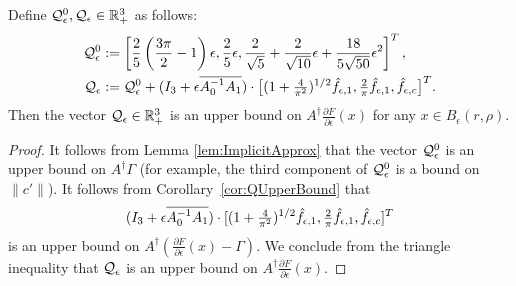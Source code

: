 \begin{lemma}\label{lem:Qeps}
%
	Define $\mathcal{Q}_\epsilon^0 , \mathcal{Q}_\epsilon \in \mathbb{R}_+^3$ as follows:
\begin{alignat}{1}
\mathcal{Q}_\epsilon^0 &:= 
\left[ \frac{2}{5}\left(\frac{3\pi}{2}-1 \right)  \epsilon,
\frac{2}{5} \epsilon , 
\frac{2}{\sqrt{5}} + \frac{2}{\sqrt{10}}\epsilon  +
\frac{18}{5\sqrt{50}}  \epsilon^2
\right]^T , \nonumber \\
\mathcal{Q}_\epsilon &:= \mathcal{Q}_\epsilon^0  + 
(I_3+\epsilon \overline{A_0^{-1} A_1} ) \cdot  \bigl[(1+\tfrac{4}{\pi^2})^{1/2}\hat{f}_{\epsilon,1},\tfrac{2}{\pi} \hat{f}_{\epsilon,1}, \hat{f}_{\epsilon,c}\bigr]^{T} . \label{e:defQeps}
\end{alignat}
Then the vector $\mathcal{Q}_\epsilon \in \mathbb{R}^3_+$ is an upper bound  on $A^{\dagger} \frac{\partial F}{\partial  \epsilon}(x)$ 
for any  $x \in B_\epsilon(r,\rho)$.
\end{lemma}
\begin{proof}
It follows from Lemma \ref{lem:ImplicitApprox} that the vector 
$\mathcal{Q}_\epsilon^0$
is an upper bound on $A^{\dagger} \Gamma$
(for example, the third component of $\mathcal{Q}_\epsilon^0$ is a bound on $\|c'\|$).
It follows from Corollary~\ref{cor:QUpperBound} that 
\[
	(I_3+\epsilon \overline{A_0^{-1} A_1} ) \cdot  [(1+\tfrac{4}{\pi^2})^{1/2}\hat{f}_{\epsilon,1},\tfrac{2}{\pi} \hat{f}_{\epsilon,1}, \hat{f}_{\epsilon,c}]^{T}
\]
 is an upper bound on $ A^\dagger ( \tfrac{\partial F}{\partial  \epsilon} (x) -\Gamma ) $.
We conclude from the triangle inequality that $\mathcal{Q}_\epsilon $ is an upper bound on $A^\dagger  \tfrac{\partial F}{\partial  \epsilon} (x)$. 
\end{proof}
 
